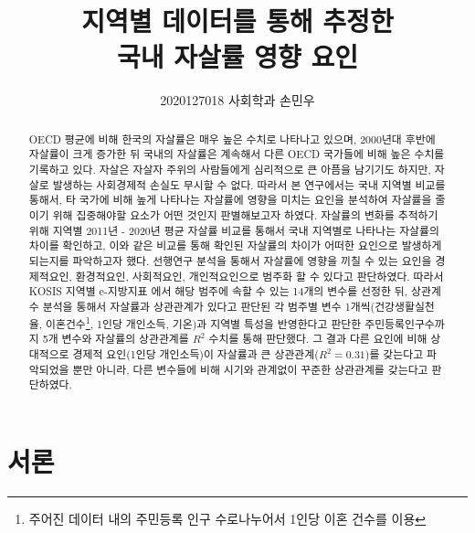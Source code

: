 \documentclass[a4paper, 11pt]{oblivoir}
\title{\textbf{지역별 데이터를 통해 추정한 \\국내 자살률 영향 요인}}
\author{2020127018 사회학과 손민우}
\date{}
\begin{document}
    \maketitle
    \begin{abstract}
        OECD 평균에 비해 한국의 자살률은 매우 높은 수치로 나타나고 있으며, 2000년대 후반에 자살률이 크게 증가한 뒤 국내의 자살률은 계속해서 다른 OECD
        국가들에 비해 높은 수치를 기록하고 있다. 자살은 자살자 주위의 사람들에게 심리적으로 큰 아픔을 남기기도 하지만, 자살로 발생하는 
        사회경제적 손실도 무시할 수 없다. 따라서 본 연구에서는 국내 지역별 비교를 통해서, 타 국가에 비해 높게 나타나는 자살률에 영향을 미치는 요인을
        분석하여 자살률을 줄이기 위해 집중해야할 요소가 어떤 것인지 판별해보고자 하였다. 자살률의 변화를 추적하기 위해 지역별 2011년 - 2020년 평균 자살률 비교를 통해서
        국내 지역별로 나타나는 자살률의 차이를 확인하고, 이와 같은 비교를 통해 확인된 자살률의 차이가 어떠한 요인으로 발생하게 되는지를 파악하고자 했다. 
        선행연구 분석을 통해서 자살률에 영향을 끼칠 수 있는 요인을 경제적요인, 환경적요인, 사회적요인, 개인적요인으로 범주화 할 수 있다고 판단하였다. 따라서 KOSIS 지역별 e-지방지표
        에서 해당 범주에 속할 수 있는 14개의 변수를 선정한 뒤, 상관계수 분석을 통해서 자살률과 상관관계가 있다고 판단된 각 범주별 변수 1개씩(건강생활실천율, 이혼건수\footnote{주어진 데이터 내의 주민등록 인구 수로나누어서 1인당 이혼 건수를 이용},
        1인당 개인소득, 기온)과 지역별 특성을 반영한다고 판단한 주민등록인구수까지 5개 변수와 자살률의 상관관계를 $R^{2}$ 수치를 통해 판단했다. 
        그 결과 다른 요인에 비해 상대적으로 경제적 요인(1인당 개인소득)이 자살률과 큰 상관관계($R^{2} = 0.31$)를 갖는다고 파악되었을 뿐만 아니라, 다른 변수들에 비해 시기와 관계없이 꾸준한 상관관계를 
        갖는다고 판단하였다.  
        
    \end{abstract}

    \tableofcontents*

    \section{서론}
\end{document}
